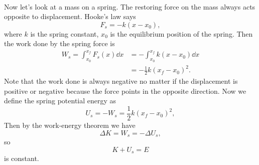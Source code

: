 \documentclass[../classical_mechanics.tex]{subfiles}
\begin{document}

        \paragraph{}
        Now let's look at a mass on a spring. The restoring force on the mass always acts opposite to displacement. Hooke's law says
        \begin{equation}
            F_s=-k(x-x_0),
        \end{equation}
        where $k$ is the spring constant, $x_0$ is the equilibrium position of the spring.
        Then the work done by the spring force is
        \begin{align}
            W_s=\int_{x_0}^{x_f}F_s(x)\dd{x}&=-\int_{x_0}^{x_f}k(x-x_0)\dd{x}\\
            &=-\frac{1}{2}k(x_f-x_0)^2.
        \end{align}
        Note that the work done is always negative no matter if the displacement is positive or negative because the force points in the opposite direction.
        Now we define the spring potential energy as
        \begin{equation}
            U_s=-W_s=\frac{1}{2}k(x_f-x_0)^2,
        \end{equation}
        Then by the work-energy theorem we have
        \begin{equation}
            \Delta K=W_s=-\Delta U_s,
        \end{equation}
        so
        \begin{equation}
            K+U_s=E
        \end{equation}
        is constant.

\end{document}
